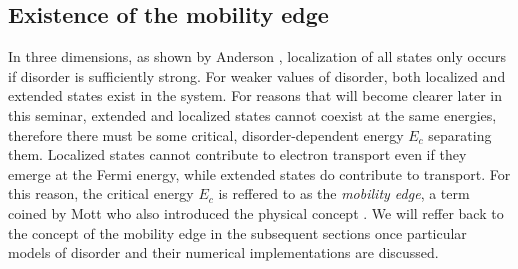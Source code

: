 \documentclass[10pt,a4paper]{article}
\begin{document}
\subsection{Existence of the mobility edge}
\label{sec:mob}
\begin{minipage}[t]{0.5\textwidth} 
In three dimensions, as shown by Anderson \cite{Anderson}, localization of all states only occurs if disorder is sufficiently strong. For weaker values of disorder, both localized and extended states exist in the system. For reasons that will become clearer later in this seminar, extended and localized states cannot coexist at the same energies, therefore there must be some critical, disorder-dependent energy $E_c$ separating them. Localized states cannot contribute to electron transport even if they emerge at the Fermi energy, while extended states do contribute to transport. For this reason, the critical energy $E_c$ is reffered to as the \emph{mobility edge}, a term coined by Mott who also introduced the physical concept \cite{Mott_transitions}. 
We will reffer back to the concept of the mobility edge in the subsequent sections once particular models of disorder and their numerical implementations are discussed. 

\end{minipage}\hfill
\end{document}
